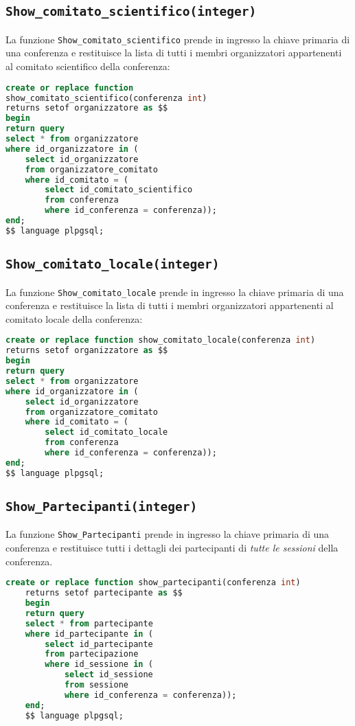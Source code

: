 \subsection{\texttt{Show\_comitato\_scientifico(integer)}}
La funzione \texttt{Show\_comitato\_scientifico} prende in ingresso la chiave primaria di una conferenza e restituisce la lista di tutti i membri organizzatori appartenenti al comitato scientifico della conferenza:
\begin{lstlisting}[language=SQL, style=mystyle]
create or replace function 
show_comitato_scientifico(conferenza int)
returns setof organizzatore as $$
begin
return query
select * from organizzatore
where id_organizzatore in (
	select id_organizzatore 
	from organizzatore_comitato
	where id_comitato = (
		select id_comitato_scientifico 
		from conferenza
		where id_conferenza = conferenza));
end;
$$ language plpgsql;
\end{lstlisting}
\subsection{\texttt{Show\_comitato\_locale(integer)}}
La funzione \texttt{Show\_comitato\_locale} prende in ingresso la chiave primaria di una conferenza e restituisce la lista di tutti i membri organizzatori appartenenti al comitato locale della conferenza:
\begin{lstlisting}[language=SQL, style=mystyle]
create or replace function show_comitato_locale(conferenza int)
returns setof organizzatore as $$
begin
return query
select * from organizzatore
where id_organizzatore in (
	select id_organizzatore 
	from organizzatore_comitato
	where id_comitato = (
		select id_comitato_locale 
		from conferenza
		where id_conferenza = conferenza));
end;
$$ language plpgsql;
\end{lstlisting}
\subsection{\texttt{Show\_Partecipanti(integer)}}
La funzione \texttt{Show\_Partecipanti} prende in ingresso la chiave primaria di una conferenza e restituisce tutti i dettagli dei partecipanti di \textit{tutte le sessioni} della conferenza.
\begin{lstlisting}[language=SQL,style=mystyle]
	create or replace function show_partecipanti(conferenza int)
	returns setof partecipante as $$
	begin
	return query
	select * from partecipante
	where id_partecipante in (
		select id_partecipante 
		from partecipazione
		where id_sessione in (
			select id_sessione 
			from sessione
			where id_conferenza = conferenza));
	end;
	$$ language plpgsql;
\end{lstlisting}

